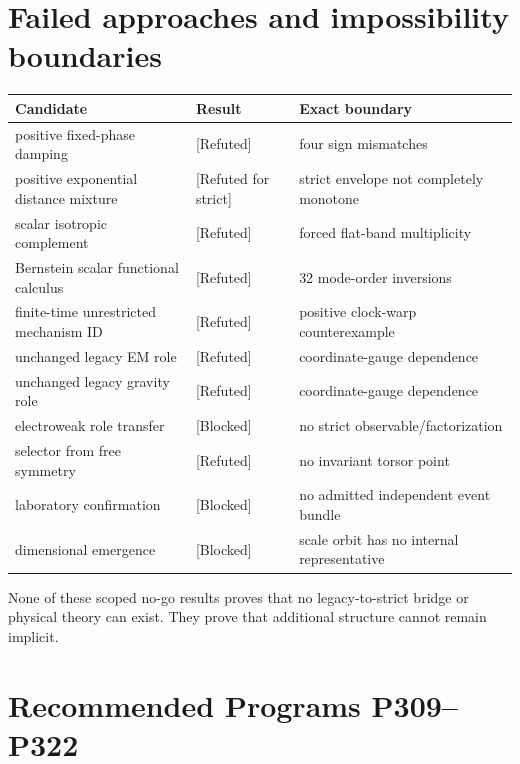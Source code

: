 \documentclass[11pt,a4paper,openany]{report}
\newcommand{\statusRefuted}{\textcolor{finred}{[Refuted]}}
\begin{document}
\chapter{Failed approaches and impossibility boundaries}

\begin{center}
\begingroup\small
\setlength{\tabcolsep}{2.5pt}
\renewcommand{\arraystretch}{1.16}
\begin{longtable}{@{}p{}p{}p{}@{}}
\toprule
\textbf{Candidate} & \textbf{Result} & \textbf{Exact boundary} \\
\midrule
\endhead
positive fixed-phase damping & \statusRefuted{} & four sign mismatches \\
positive exponential distance mixture & [Refuted for strict] & strict envelope not completely monotone \\
scalar isotropic complement & \statusRefuted{} & forced flat-band multiplicity \\
Bernstein scalar functional calculus & \statusRefuted{} & 32 mode-order inversions \\
finite-time unrestricted mechanism ID & \statusRefuted{} & positive clock-warp counterexample \\
unchanged legacy EM role & \statusRefuted{} & coordinate-gauge dependence \\
unchanged legacy gravity role & \statusRefuted{} & coordinate-gauge dependence \\
electroweak role transfer & [Blocked] & no strict observable/\allowbreak{}factorization \\
selector from free symmetry & \statusRefuted{} & no invariant torsor point \\
laboratory confirmation & [Blocked] & no admitted independent event bundle \\
dimensional emergence & [Blocked] & scale orbit has no internal representative \\
\bottomrule
\end{longtable}
\endgroup
\end{center}

None of these scoped no-go results proves that no legacy-to-strict bridge or physical theory can exist. They prove that additional structure cannot remain implicit.

\chapter{Recommended Programs P309--P322}
\end{document}
